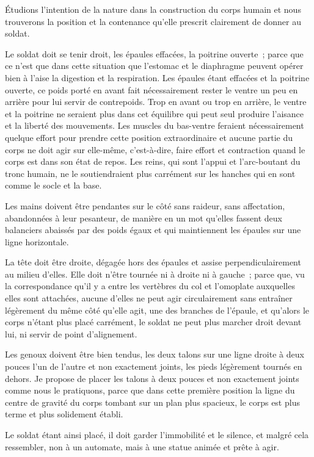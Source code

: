 \documentclass[french,twoside]{book} %
\begin{document}
Étudions l’intention de la nature dans la construction du corps humain et nous trouverons la position et la contenance qu’elle prescrit clairement de donner au soldat.\par
Le soldat doit se tenir droit, les épaules effacées, la poitrine ouverte ; parce que ce n’est que dans cette situation que l’estomac et le diaphragme peuvent opérer bien à l’aise la digestion et la respiration. Les épaules étant effacées et la poitrine ouverte, ce poids porté en avant fait nécessairement rester le ventre un peu en arrière pour lui servir de contrepoids. Trop en avant ou trop en arrière, le ventre et la poitrine ne seraient plus dans cet équilibre qui peut seul produire l’aisance et la liberté des mouvements. Les muscles du bas-ventre feraient nécessairement quelque effort pour prendre cette position extraordinaire et aucune partie du corps ne doit agir sur elle-même, c’est-à-dire, faire effort et contraction quand le corps est dans son état de repos. Les reins, qui sont l’appui et l’arc-boutant du tronc humain, ne le soutiendraient plus carrément sur les hanches qui en sont comme le socle et la base.\par
Les mains doivent être pendantes sur le côté sans raideur, sans affectation, abandonnées à leur pesanteur, de manière en un mot qu’elles fassent deux balanciers abaissés par des poids égaux et qui maintiennent les épaules sur une ligne horizontale.\par
La tête doit être droite, dégagée hors des épaules et assise perpendiculairement au milieu d’elles. Elle doit n’être tournée ni à droite ni à gauche ; parce que, vu la correspondance qu’il y a entre les vertèbres du col et l’omoplate auxquelles elles sont attachées, aucune d’elles ne peut agir circulairement sans entraîner légèrement du même côté qu’elle agit, une des branches de l’épaule, et qu’alors le corps n’étant plus placé carrément, le soldat ne peut plus marcher droit devant lui, ni servir de point d’alignement.\par
Les genoux doivent être bien tendus, les deux talons sur une ligne droite à deux pouces l’un de l’autre et non exactement joints, les pieds légèrement tournés en dehors. Je propose de placer les talons à deux pouces et non exactement joints comme nous le pratiquons, parce que dans cette première position la ligne du centre de gravité du corps tombant sur un plan plus spacieux, le corps est plus terme et plus solidement établi.\par
Le soldat étant ainsi placé, il doit garder l’immobilité et le silence, et malgré cela ressembler, non à un automate, mais à une statue animée et prête à agir.\par
\end{document}
